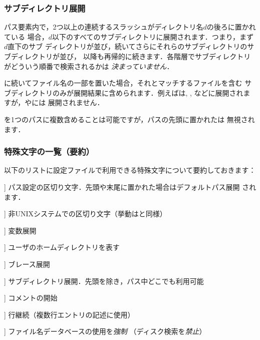 \documentclass[uplatex,dvipdfmx]{jsarticle}
\begin{document}
\subsubsection{サブディレクトリ展開}
\label{sec:subdirectory-expansion}

パス要素内で，2つ以上の連続するスラッシュがディレクトリ名$d$の後ろに置かれている
場合，$d$以下のすべてのサブディレクトリに展開されます．つまり，まず$d$直下のサブ
ディレクトリが並び，続いてさらにそれらのサブディレクトリのサブディレクトリが並び，
以降も再帰的に続きます．各階層でサブディレクトリがどういう順番で検索されるかは
\emph{決まっていません}．

\samp{//}に続いてファイル名の一部を置いた場合，それとマッチするファイルを含む
サブディレクトリのみが展開結果に含められます．例えばは,
, などに展開されますが，やには
展開されません．

\samp{//}を1つのパスに複数含めることは可能ですが，パスの先頭に置かれた\samp{//}は
無視されます．

\subsubsection{特殊文字の一覧（要約）}

以下のリストに\KPS 設定ファイルで利用できる特殊文字について要約しておきます：
%
\begin{description}
\newcommand{\CODE}[1]{\makebox[3em][l]{\code{#1}}}
\item[\CODE{:}] パス設定の区切り文字．先頭や末尾に置かれた場合はデフォルトパス展開
  されます．
\item[\CODE{;}] 非UNIXシステムでの区切り文字（挙動は\code{:}と同様）
\item[\CODE{\$}] 変数展開
\item[\CODE{\string~}] ユーザのホームディレクトリを表す
\item[\CODE{\char`\{...\char`\}}] ブレース展開
\item[\CODE{//}] サブディレクトリ展開．先頭を除き，パス中どこでも利用可能
\item[\CODE{\%}] コメントの開始
\item[\CODE{\bs}] 行継続（複数行エントリの記述に使用）
\item[\CODE{!!}] ファイル名データベースの使用を\emph{強制}
  （ディスク検索を\emph{禁止}）
\end{description}
\end{document}
